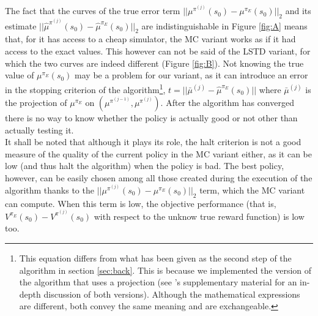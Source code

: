 \documentclass{jfpda2011}
\begin{document}
The fact that  the curves of the true error term $||\mu^{\pi^{(j)}}(s_0) - \mu^{\pi_E}(s_0)||_2$ and  its estimate $||\hat\mu^{\pi^{(j)}}(s_0) - \hat\mu^{\pi_E}(s_0)||_2$ are indistinguishable in Figure \ref{fig:A} means that, for it has access to a cheap simulator, the MC variant works as if it had access to the exact values. This however can not be said of the LSTD variant, for which the two curves are indeed different (Figure \ref{fig:B}). Not knowing the true value of $\mu^{\pi_E}(s_0)$ may be a problem for our variant, as it can introduce an error in the stopping criterion of the algorithm\footnote{This equation differs from what has been given as the second step of the algorithm in section \ref{sec:back}. This is because we implemented the version of the algorithm that uses a projection (see \citet{abbeel2004apprenticeship}'s supplementary material for an in-depth discussion of both versions). Although the mathematical expressions are different, both convey the same meaning and are exchangeable.}, $t = ||\bar\mu^{(j)}-\hat\mu^{\pi_E}(s_0)||$ where $\bar\mu^{(j)}$ is the projection of $\mu^{\pi_E}$ on $(\mu^{\pi^{(j-1)}},\mu^{\pi^{(j)}})$. After the algorithm has converged there is no way to know whether the policy is actually good or not other than actually testing it.\\

It shall be noted that although it plays its role, the halt criterion is not a good measure of the quality of the current policy in the MC variant either, as it can be low (and thus halt the algorithm) when the policy is bad. The best policy, however, can be easily chosen among all those created during the execution of the algorithm thanks to the $||\mu^{\pi^{(j)}}(s_0) - \mu^{\pi_E}(s_0)||_2$ term, which the MC variant can compute. When this term is low, the objective performance (that is, $V^{\pi_E}(s_0)-V^{\pi^{(j)}}(s_0)$ with respect to the unknow true reward function) is low too. 
\end{document}
